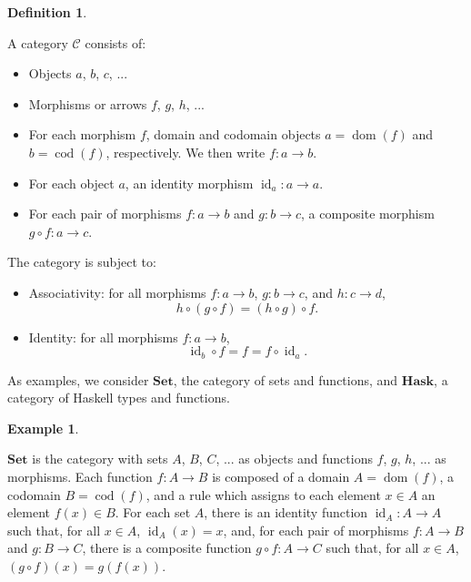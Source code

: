 \documentclass[11pt,letterpaper]{article}
\theoremstyle{definition}
\newtheorem{definition}{Definition}[section]
\newtheorem{example}{Example}[section]
\DeclareMathOperator{\dom}{dom}
\DeclareMathOperator{\cod}{cod}
\DeclareMathOperator{\id}{id}
\newcommand{\idO}[1]{\natO{\id}{#1}}
\newcommand{\comp}{\ensuremath{\mathrel{\circ}}}
\newcommand{\cat}[1]{\ensuremath{\mathcal{#1}}}
\newcommand{\catbf}[1]{\ensuremath{\mathbf{#1}}\xspace}
\newcommand{\hask}{\catbf{Hask}}
\newcommand{\set}{\catbf{Set}}
\newcommand{\nat}[1]{\ensuremath{#1}}
\newcommand{\natO}[2]{\ensuremath{\nat{#1}_{#2}}}
\begin{document}
\begin{definition}
  \label{def:category}


  A category \cat{C} consists of:
  \begin{itemize}
  \item
    Objects $a$, $b$, $c$, ...
  \item
    Morphisms or arrows $f$, $g$, $h$, ...
  \item
    For each morphism $f$, domain and codomain objects $a = \dom(f)$
    and $b = \cod(f)$, respectively. We then write $f: a \to b$.
  \item
    For each object $a$, an identity morphism $\idO{a}: a \to a$.
  \item
    For each pair of morphisms $f: a \to b$ and $g: b \to c$, a
    composite morphism $g \comp f: a \to c$.
  \end{itemize}
  The category is subject to:
  \begin{itemize}
  \item
    Associativity: for all morphisms $f: a \to b$, $g: b \to c$, and
    $h: c \to d$,
    \begin{equation*}
      h \comp (g \comp f) = (h \comp g) \comp f
      \text{.}
    \end{equation*}
  \item
    Identity: for all morphisms $f: a \to b$,
    \begin{equation*}
      \idO{b} \comp f = f = f \comp \idO{a}
      \text{.}
    \end{equation*}
  \end{itemize}

\end{definition}

As examples, we consider \set, the category of sets and functions, and
\hask, a category of Haskell types and functions.

\begin{example}
  \label{ex:set}


  \set is the category with sets $A$, $B$, $C$, ... as objects and
  functions $f$, $g$, $h$, ... as morphisms. Each function $f: A \to
  B$ is composed of a domain $A = \dom(f)$, a codomain $B = \cod(f)$,
  and a rule which assigns to each element $x \in A$ an element $f(x)
  \in B$. For each set $A$, there is an identity function $\idO{A}: A
  \to A$ such that, for all $x \in A$, $\idO{A}(x) = x$, and, for each
  pair of morphisms $f: A \to B$ and $g: B \to C$, there is a
  composite function $g \comp f: A \to C$ such that, for all $x \in
  A$, $(g \comp f)(x) = g(f(x))$.

\end{example}
\end{document}
